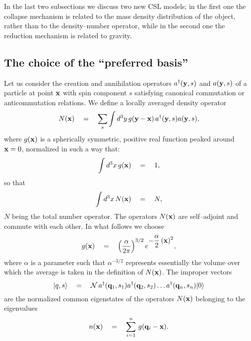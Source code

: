 \documentclass[12pt]{article}
\begin{document}
In the last two subsections we discuss two new CSL models; in the
first one the collapse mechanism is related to the mass density
distribution of the object, rather than to the density--number
operator, while in the second one the reduction mechanism is
related to gravity.


\subsection{The choice of the ``preferred basis''} \label{sec71}

Let us consider the creation and annihilation operators
$a^{\dagger}({\bf y}, s)$ and $a({\bf y}, s)$  of a particle at
point ${\bf x}$ with spin component $s$ satisfying canonical
commutation or anticommutation relations. We define a locally
averaged density operator
\begin{equation} \label{ando}
N({\bf x}) \quad = \quad \sum_{s}\int d^{3}y\, g({\bf y} - {\bf
x})\, a^{\dagger}({\bf y}, s)a({\bf y}, s),
\end{equation}
where $g({\bf x})$ is a spherically symmetric, positive real
function peaked around ${\bf x} = 0$, normalized in such a way
that:
\[
\int d^{3}x\, g({\bf x}) \quad = \quad 1,
\]
so that
\[
\int d^{3}x\, N({\bf x}) \quad = \quad N,
\]
$N$ being the total number operator. The operators $N({\bf x})$
are self--adjoint and commute with each other. In what follows we
choose
\begin{equation} \label{gggg}
g({\bf x}) \quad = \quad \left(\frac{\alpha}{2\pi}\right)^{3/2}
e^{\displaystyle -\frac{\alpha}{2}\, ({\bf x})^{2}},
\end{equation}
where $\alpha$ is a parameter such that $\alpha^{-3/2}$ represents
essentially the volume over which the average is taken in the
definition of $N({\bf x})$. The improper vectors
\begin{equation} \label{ces}
|q, s\rangle \quad = \quad {\mathcal N}\, a^{\dagger}({\bf q}_{1},
s_{1}) a^{\dagger}({\bf q}_{2}, s_{2}) \ldots a^{\dagger}({\bf
q}_{n}, s_{n})|0\rangle
\end{equation}
are the normalized common eigenstates of the operators $N({\bf
x})$ belonging to the eigenvalues
\[
n({\bf x}) \quad = \quad \sum_{i=1}^{n}\, g({\bf q}_{i} - {\bf
x}).
\]
\end{document}
